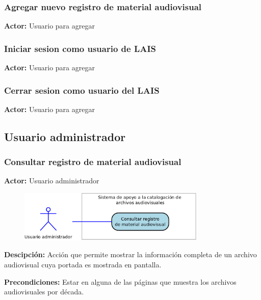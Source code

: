 \documentclass[10pt,letterpaper]{article}
\begin{document}
\subsubsection{Agregar nuevo registro de material audiovisual}
\textbf{Actor:} Usuario para agregar

\subsubsection{Iniciar sesion como usuario de LAIS}
\textbf{Actor:} Usuario para agregar

\subsubsection{Cerrar sesion como usuario del LAIS}
\textbf{Actor:} Usuario para agregar

\subsection{Usuario administrador}

\subsubsection{Consultar registro de material audiovisual}
\textbf{Actor:} Usuario administrador

\begin{figure}[H]
	\centering
	\includegraphics[width=0.8\textwidth]{CasoDeUso_Administrador_ConsultarRegistro.png}
\end{figure}

\textbf{Descipción: } Acción que permite mostrar la información completa de un archivo audiovisual cuya portada es mostrada en pantalla.

\textbf{Precondiciones:} Estar en alguna de las páginas que muestra los archivos audiovisuales por década.
\end{document}
